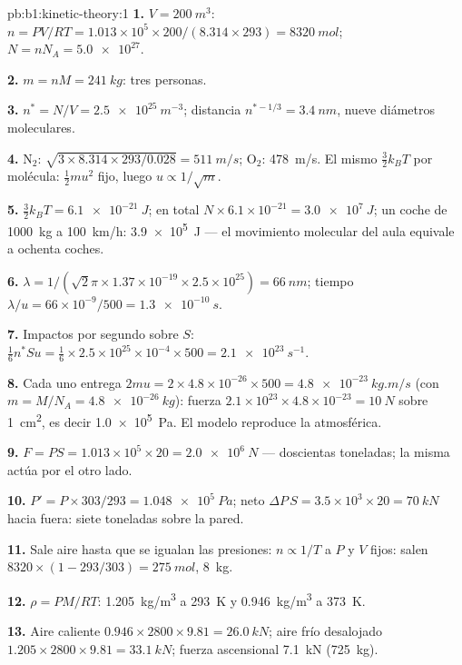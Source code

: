 \begin{solution}{pb:b1:kinetic-theory:1}
\textbf{1.} $V = \qty{200}{m^3}$: $n = PV/RT = 1.013\times10^5 \times 200/(8.314
\times 293) = \qty{8320}{mol}$; $N = nN_A = \num{5.0e27}$.

\textbf{2.} $m = nM = \qty{241}{kg}$: tres personas.

\textbf{3.} $n^* = N/V = \qty{2.5e25}{m^{-3}}$; distancia $n^{*-1/3} = \qty{3.4}{nm}$,
nueve diámetros moleculares.

\textbf{4.} N$_2$: $\sqrt{3 \times 8.314 \times 293/0.028} = \qty{511}{m/s}$;
O$_2$: \qty{478}{m/s}. El mismo $\tfrac32 k_BT$ por molécula: $\tfrac12 mu^2$
fijo, luego $u \propto 1/\sqrt m$.

\textbf{5.} $\tfrac32 k_BT = \qty{6.1e-21}{J}$; en total $N \times 6.1\times10^{-21}
= \qty{3.0e7}{J}$; un coche de \qty{1000}{kg} a \qty{100}{km/h}: \qty{3.9e5}{J} ---
el movimiento molecular del aula equivale a ochenta coches.

\textbf{6.} $\lambda = 1/(\sqrt2\pi \times 1.37\times10^{-19} \times 2.5\times10^{25})
= \qty{66}{nm}$; tiempo $\lambda/u = 66\times10^{-9}/500 = \qty{1.3e-10}{s}$.

\textbf{7.} Impactos por segundo sobre $S$: $\tfrac16 n^*Su = \tfrac16 \times 2.5\times
10^{25} \times 10^{-4} \times 500 = \qty{2.1e23}{s^{-1}}$.

\textbf{8.} Cada uno entrega $2mu = 2 \times 4.8\times10^{-26} \times 500 = \qty{4.8e-23}{kg.m/s}$
(con $m = M/N_A = \qty{4.8e-26}{kg}$): fuerza $2.1\times10^{23} \times 4.8\times10^{-23}
= \qty{10}{N}$ sobre \qty{1}{cm^2}, es decir \qty{1.0e5}{Pa}. El modelo
reproduce la  atmosférica.

\textbf{9.} $F = PS = 1.013\times10^5 \times 20 = \qty{2.0e6}{N}$ --- doscientas
toneladas; la misma  actúa por el otro lado.

\textbf{10.} $P' = P \times 303/293 = \qty{1.048e5}{Pa}$; neto $\Delta P\,S = 3.5
\times10^3 \times 20 = \qty{70}{kN}$ hacia fuera: siete toneladas sobre la pared.

\textbf{11.} Sale aire hasta que se igualan las presiones: $n \propto 1/T$ a
$P$ y $V$ fijos: salen $8320 \times (1 - 293/303) = \qty{275}{mol}$,
\qty{8}{kg}.

\textbf{12.} $\rho = PM/RT$: \qty{1.205}{kg/m^3} a \qty{293}{K} y \qty{0.946}{kg/m^3}
a \qty{373}{K}.

\textbf{13.} Aire caliente $0.946 \times 2800 \times 9.81 = \qty{26.0}{kN}$; aire
frío desalojado $1.205 \times 2800 \times 9.81 = \qty{33.1}{kN}$; fuerza
ascensional \qty{7.1}{kN} (\qty{725}{kg}).


\end{solution}
